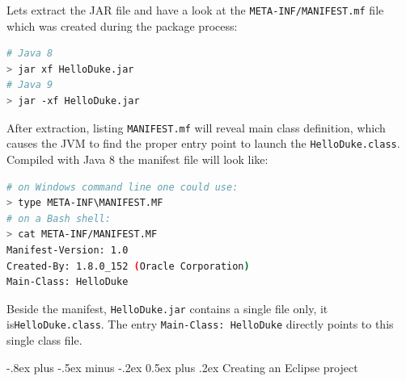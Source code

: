 \documentclass[10pt,landscape,a4paper]{article}
\makeatletter
\renewcommand{\section}{\@startsection{section}{1}{0mm}%
                                {-.8ex plus -.5ex minus -.2ex}%
                                {0.5ex plus .2ex}%
                                {\normalfont\large\bfseries}}
\makeatother
\begin{document}
\begin{multicols}{2}
\begin{lstlisting}[language=bash,frame=single]
\end{lstlisting}
Lets extract the JAR file and have a look at the \texttt{META-INF/MANIFEST.mf} file which was created during the package process:
\begin{lstlisting}[language=bash,frame=single]
# Java 8
> jar xf HelloDuke.jar
# Java 9
> jar -xf HelloDuke.jar
\end{lstlisting}
After extraction, listing \texttt{MANIFEST.mf} will reveal main class definition, which causes the JVM to find the proper entry point to launch the \texttt{HelloDuke.class}. Compiled with Java 8 the manifest file will look like:
\begin{lstlisting}[language=bash,frame=single]
# on Windows command line one could use:
> type META-INF\MANIFEST.MF
# on a Bash shell:
> cat META-INF/MANIFEST.MF
Manifest-Version: 1.0
Created-By: 1.8.0_152 (Oracle Corporation)
Main-Class: HelloDuke
\end{lstlisting}
Beside the manifest, \texttt{HelloDuke.jar} contains a single file only, it is\texttt{HelloDuke.class}. The entry \texttt{Main-Class: HelloDuke} directly points to this single class file.

\section{Creating an Eclipse project}

\end{multicols}
\end{document}
